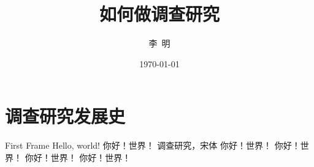 \documentclass{beamer}
\title{如何做调查研究}
\date{\today}
\author{李\ 明}
\institute{南京大学新闻传播学院}
\begin{document}
  \maketitle
  
  \section{调查研究发展史}
  \begin{frame}{First Frame}
    Hello, world!
    你好！世界！
    调查研究，宋体
    \songti 你好！世界！
    \heiti 你好！世界！
    \kaishu 你好！世界！
    你好！世界！  
  \end{frame}
 
\end{document}
